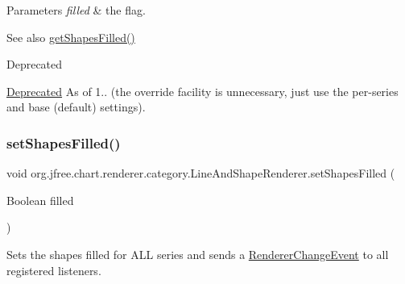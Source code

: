 \begin{DoxyParams}{Parameters}
{\em filled} & the flag.\\
\hline
\end{DoxyParams}
\begin{DoxySeeAlso}{See also}
\mbox{\hyperlink{classorg_1_1jfree_1_1chart_1_1renderer_1_1category_1_1_line_and_shape_renderer_a23e8590957112ba46cca634918b3ca3d}{get\+Shapes\+Filled()}}
\end{DoxySeeAlso}
\begin{DoxyRefDesc}{Deprecated}
\item[\mbox{\hyperlink{deprecated__deprecated000193}{Deprecated}}]As of 1.. (the override facility is unnecessary, just use the per-\/series and base (default) settings). \end{DoxyRefDesc}
\mbox{\label{classorg_1_1jfree_1_1chart_1_1renderer_1_1category_1_1_line_and_shape_renderer_a63f8d091a4a49eb3b3b7f8646760b7b3}} 
\subsubsection{\texorpdfstring{set\+Shapes\+Filled()}{setShapesFilled()}\hspace{0.1cm}{\footnotesize\ttfamily [2/2]}}
{\footnotesize\ttfamily void org.\+jfree.\+chart.\+renderer.\+category.\+Line\+And\+Shape\+Renderer.\+set\+Shapes\+Filled (\begin{DoxyParamCaption}\item[{Boolean}]{filled }\end{DoxyParamCaption})}

Sets the \textquotesingle{}shapes filled\textquotesingle{} for A\+LL series and sends a \mbox{\hyperlink{}{Renderer\+Change\+Event}} to all registered listeners.


